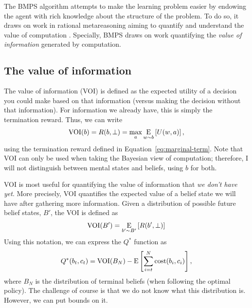 The BMPS algorithm attempts to make the learning problem easier by endowing the agent with rich knowledge about the structure of the problem. To do so, it draws on work in rational metareasoning aiming to quantify and understand the value of computation \citep{matheson1968economic,horvitz1987reasoning,russell1991principles}. Specially, BMPS draws on work quantifying the \emph{value of information} generated by computation. 

\subsection{The value of information}\label{sec:voi}

The value of information (VOI) is defined as the expected utility of a decision you could make based on that information (versus making the decision without that information). For information we already have, this is simply the termination reward. Thus, we can write
%
\begin{equation}\label{eq:main-voi}
  \VOI(b) = R(b, \bot) = \max_a \expectunder{U(w, a)}{w \sim b},
\end{equation}
using the termination reward defined in Equation~\ref{eq:marginal-term}. Note that VOI can only be used when taking the Bayesian view of computation; therefore, I will not distinguish between mental states and beliefs, using $b$ for both.

VOI is most useful for quantifying the value of information that \emph{we don't have yet}. More precisely, VOI quantifies the expected value of a belief state we will have after gathering more information. Given a distribution of possible future belief states, $B'$, the VOI is defined as
%
\begin{equation}
  \VOI(B') = \expectunder{R(b', \bot)}{b' \sim B'}
\end{equation}
%
Using this notation, we can express the $Q^*$ function as
%
\begin{equation}\label{eq:Q-VOI}
  Q^*(b_t, c_t) = 
    \VOI(B_N) - \E\left[\sum_{i=t}^{\tmax} \cost(b_i, c_i) \right],
\end{equation}
where $B_N$ is the distribution of terminal beliefs (when following the optimal policy). The challenge of course is that we do not know what this distribution is. However, we can put bounds on it.

